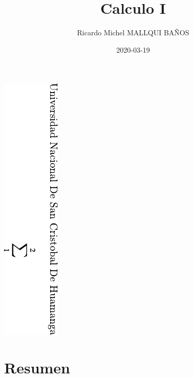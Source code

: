 \documentclass[12pt,]{krantz}
\title{Calculo I}
\author{Ricardo Michel MALLQUI BAÑOS}
\institute{Universidad Nacional San Cristóbal De Huamanga}
\date{2020-03-19}
\theoremstyle{definition}
\theoremstyle{definition}
\theoremstyle{definition}
\theoremstyle{remark}
\begin{document}
\maketitle

\thispagestyle{empty}
\begin{center}
\includegraphics{dedication.pdf}
\end{center}


{
\setcounter{tocdepth}{1}
\tableofcontents
}
\newcommand{\N}{\mathbb{N}}
\newcommand{\R}{\mathbb{R}}
\newcommand{\CC}{\mathbb{C}}
\newcommand{\I}{\mathbb{I}}
\newcommand{\f}{\mathbb{f}}
\newcommand{\X}{\mathbb{X}}
\newcommand{\D}{\mathbb{D}}
\newcommand{\Z}{\mathbb{Z}}
\newcommand{\Q}{\mathbb{Q}}
\newcommand{\norm}[1]{\left\Vert#1\right\Vert}
\newcommand{\abs}[1]{\left\vert#1\right\vert}
\newcommand{\set}[1]{\left\{#1\right\}}
\newcommand{\seq}[1]{\left<#1\right>}
\newcommand{\co}[1]{\left[#1\right]}
\newcommand{\cc}[1]{\left(#1\right)}
\newcommand{\J}{\mathcal{J}}
\newcommand{\K}{\mathcal{K}}
\newcommand{\M}{\mathcal{M}}
\newcommand{\F}{\mathcal{F}}

\hypertarget{resumen}{%
\chapter*{Resumen}\label{resumen}}
\end{document}
